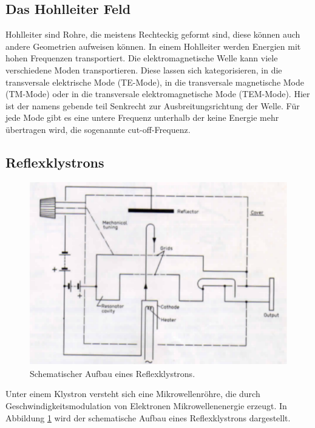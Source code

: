 \subsection{Das Hohlleiter Feld}
Hohlleiter sind Rohre, die meistens Rechteckig geformt sind, diese können auch andere Geometrien aufweisen können. In einem Hohlleiter werden Energien mit hohen Frequenzen transportiert. Die elektromagnetische Welle kann viele verschiedene Moden transportieren. Diese lassen sich kategorisieren, in die transversale elektrische Mode (TE-Mode), in die transversale magnetische Mode (TM-Mode) oder in die transversale elektromagnetische Mode (TEM-Mode). Hier ist der namens gebende teil Senkrecht zur Ausbreitungsrichtung der Welle. Für jede Mode gibt es eine untere Frequenz unterhalb der keine Energie mehr übertragen wird, die sogenannte cut-off-Frequenz.

\subsection{Reflexklystrons}
\begin{figure}[h!]
\centering
	\includegraphics[angle = 0.1]{../Grafiken/Klystron_Schema.pdf}
	\caption{Schematischer Aufbau eines Reflexklystrons.}\label{fig:RefKlystron}
\end{figure}
Unter einem Klystron versteht sich eine Mikrowellenröhre, die durch Geschwindigkeitsmodulation von Elektronen Mikrowellenenergie erzeugt. In Abbildung \ref{fig:RefKlystron} wird der schematische Aufbau eines Reflexklystrons dargestellt.